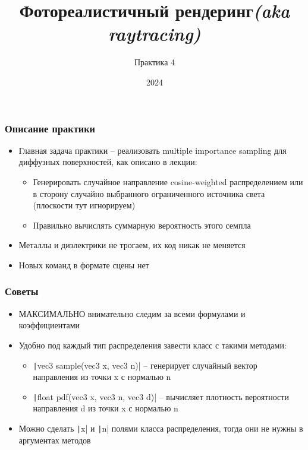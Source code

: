 \documentclass[10pt,handout]{beamer}
\title{Фотореалистичный рендеринг\quad\quad\quad\quad\quad\quad \textit{(aka raytracing)}}
\subtitle{Практика 4}
\date{2024}
\begin{document}
\frame{\titlepage}

\begin{frame}[fragile]
\frametitle{Описание практики}
\begin{itemize}
\item Главная задача практики -- реализовать multiple importance sampling для диффузных поверхностей, как описано в лекции:
\begin{itemize}
\item Генерировать случайное направление cosine-weighted распределением или в сторону случайно выбранного ограниченного источника света (плоскости тут игнорируем)
\item Правильно вычислять суммарную вероятность этого семпла
\end{itemize}
\item Металлы и диэлектрики не трогаем, их код никак не меняется
\item Новых команд в формате сцены нет
\end{itemize}
\end{frame}

\begin{frame}[fragile]
\frametitle{Советы}
\begin{itemize}
\item МАКСИМАЛЬНО внимательно следим за всеми формулами и коэффициентами
\item Удобно под каждый тип распределения завести класс с такими методами:
\begin{itemize}
\item \texttt|vec3 sample(vec3 x, vec3 n)| -- генерирует случайный вектор направления из точки x с нормалью n
\item \texttt|float pdf(vec3 x, vec3 n, vec3 d)| -- вычисляет плотность вероятности направления d из точки x с нормалью n
\end{itemize}
\item Можно сделать \texttt|x| и \texttt|n| полями класса распределения, тогда они не нужны в аргументах методов
\end{itemize}
\end{frame}
\end{document}
